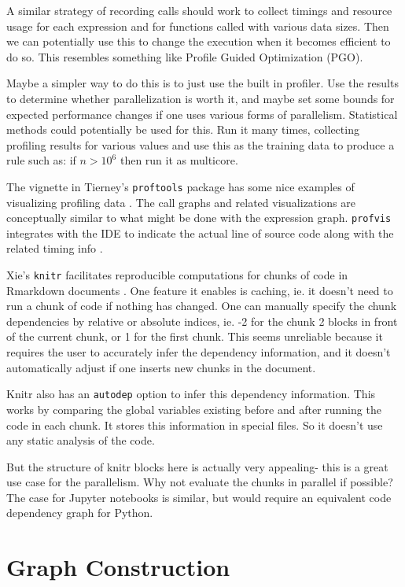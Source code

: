 \documentclass[12pt]{article}
\begin{document}
A similar strategy of recording calls should work to collect timings and
resource usage for each expression and for functions called with various
data sizes. Then we can potentially use this to change the execution when
it becomes efficient to do so.  This resembles something like Profile
Guided Optimization (PGO). 

Maybe a simpler way to do this is to just use the built in profiler. Use
the results to determine whether parallelization is worth it, and maybe set
some bounds for expected performance changes if one uses various forms of
parallelism.  Statistical methods could potentially be used for this.
Run it many times, collecting profiling results for various values and use
this as the training data to produce a rule such as: if $n > 10^6$ then run
it as multicore.

The vignette in Tierney's \texttt{proftools} package has some nice examples
of visualizing profiling data \cite{R-proftools}. The call graphs and
related visualizations are conceptually similar to what might be done with
the expression graph.  \texttt{profvis} integrates with the IDE to indicate
the actual line of source code along with the related timing info
\cite{R-profvis}.

Xie's \texttt{knitr} facilitates reproducible computations for
chunks of code in Rmarkdown documents \cite{R-knitr}. One feature it enables is caching,
ie. it doesn't need to run a chunk of code if nothing has changed. One can
manually specify the chunk dependencies by relative or absolute indices,
ie. -2 for the chunk 2 blocks in front of the current chunk, or 1 for the
first chunk. This seems unreliable because it requires the user to
accurately infer the dependency information, and it doesn't automatically
adjust if one inserts new chunks in the document.

Knitr also has an \texttt{autodep} option to infer this dependency
information. This works by comparing the global variables existing before
and after running the code in each chunk. It stores this information in
special files. So it doesn't use any static analysis of the code.

But the structure of knitr blocks here is actually very appealing- this is
a great use case for the parallelism. Why not evaluate the chunks in
parallel if possible? The case for Jupyter notebooks is similar, but would
require an equivalent code dependency graph for Python.

\section{Graph Construction}
\end{document}
